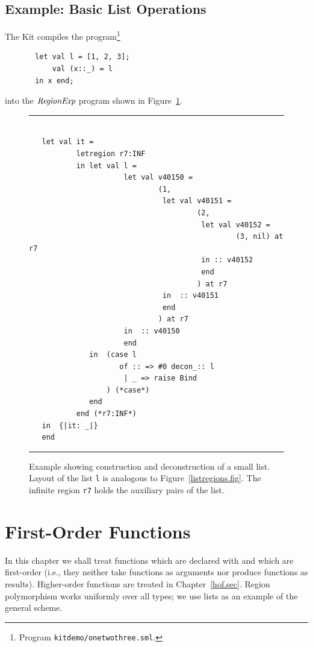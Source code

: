 \documentclass[12pt]{book}
\begin{document}
\section{Example: Basic List Operations}
\label{listexamples.sec}
The Kit compiles the program\footnote{Program \texttt{kitdemo/onetwothree.sml}.}  
\begin{verbatim}
       let val l = [1, 2, 3];
           val (x::_) = l
       in x end;
\end{verbatim}       
into the $\hbox{\it RegionExp}$ program shown in Figure~\ref{listprint.fig}.
\begin{figure}
\hrule
\begin{verbatim}

   let val it = 
           letregion r7:INF 
           in let val l = 
                      let val v40150 = 
                              (1, 
                               let val v40151 = 
                                       (2, 
                                        let val v40152 = 
                                                (3, nil) at r7 
                                        in :: v40152 
                                        end 
                                       ) at r7
                               in  :: v40151
                               end 
                              ) at r7
                      in  :: v40150
                      end 
              in  (case l 
                     of :: => #0 decon_:: l 
                      | _ => raise Bind
                  ) (*case*) 
              end  
           end (*r7:INF*)
   in  {|it: _|}
   end 
\end{verbatim}
\caption{Example showing construction and deconstruction of a small list.
Layout of the list {\tt l} is analogous to Figure~\ref{listregions.fig}.
The infinite region {\tt r7} holds the auxiliary pairs of the list.
}
\label{listprint.fig}
\medskip

\hrule
\end{figure}

\chapter{First-Order Functions}
In this chapter we shall treat functions which are declared with
 and which are first-order (i.e., they neither take functions
as arguments nor produce functions as results). Higher-order functions
are treated in Chapter~\ref{hof.sec}.
Region polymorphism works uniformly over all types; 
we use lists as an example of the general scheme. 
\end{document}
